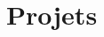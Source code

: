 \documentclass[a4paper,12pt]{article}
\begin{document}
\begin{comment}
\begin{tabularx}{\linewidth}{ @{}l r@{} }
\textbf{Designation} & \hfill Jan 2021 - present \\[3.75pt]
\multicolumn{2}{@{}X@{}}{long long line of blah blah that will wrap when the table fills the column width long long line of blah blah that will wrap when the table fills the column width long long line of blah blah that will wrap when the table fills the column width long long line of blah blah that will wrap when the table fills the column width}  \\
\end{tabularx}

\begin{tabularx}{\linewidth}{ @{}l r@{} }
\textbf{Designation} & \hfill Mar 2019 - Jan 2021 \\[3.75pt]
\multicolumn{2}{@{}X@{}}{
\begin{minipage}[t]{\linewidth}
    \begin{itemize}[nosep,after=\strut, leftmargin=1em, itemsep=3pt]
        \item[--] long long line of blah blah that will wrap when the table fills the column width
        \item[--] again, long long line of blah blah that will wrap when the table fills the column width but this time even more long long line of blah blah. again, long long line of blah blah that will wrap when the table fills the column width but this time even more long long line of blah blah
    \end{itemize}
    \end{minipage}
}
\end{tabularx}
\end{comment}
\section{Projets}
\end{document}
